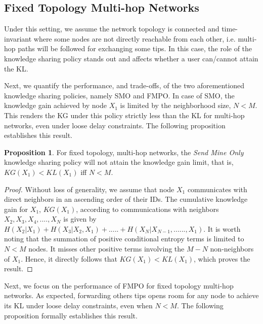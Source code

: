 \documentclass[conference]{IEEEtran}
\theoremstyle{definition}
\newtheorem{prop}{Proposition}
\begin{document}
\subsection{Fixed Topology Multi-hop Networks}
Under this setting, we assume the network topology is connected and time-invariant where some nodes are not directly reachable from each other, i.e. multi-hop paths will be followed for exchanging 
some tips. In this case, the role of the knowledge sharing policy stands out and 
affects whether a user can/cannot attain the KL.


Next, we quantify the performance, and trade-offs, of the two aforementioned knowledge sharing policies, namely SMO and FMPO. In case of
SMO, the knowledge gain achieved by node $X_1$ is limited by the neighborhood size, $N<M$. This renders the KG under this policy strictly less than the KL for multi-hop networks, even under loose delay constraints. The following proposition establishes this result.

\begin{prop}
For fixed topology, multi-hop networks, the {\it Send Mine Only} knowledge sharing policy will not attain the knowledge gain limit, that is, $KG(X_1)<KL(X_1)$ iff $N < M$.
\end{prop}
\vspace{-0.2 cm}
\begin{proof}
Without loss of generality, we assume that node $X_1$ communicates with direct neighbors in an ascending order of their IDs. The cumulative knowledge gain for $X_1$, $KG(X_1)$, according to communications with neighbors $X_2, X_3, X_4,...., X_{N}$ is given by $H(X_2|X_1) + H(X_3|X_2,X_1) + .....+ H(X_{N}|X_{N-1}, ......, X_1)$. It is worth noting that the summation of positive conditional entropy terms is limited to $N<M$ nodes. It misses other positive terms involving the $M-N$ non-neighbors of $X_1$. Hence, it directly follows that $KG(X_1)<KL(X_1)$, which proves the result.
\end{proof}






Next, we focus on the performance of FMPO for fixed topology multi-hop networks. As expected, forwarding others tips opens room for any node to achieve its KL under loose delay constraints, even when $N<M$. The following proposition formally establishes this result. 
\end{document}
